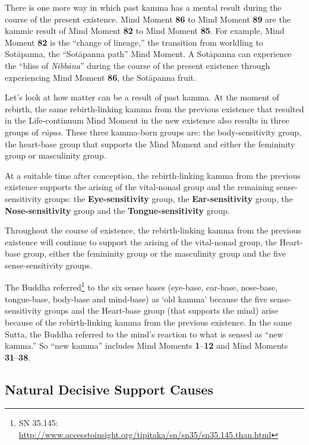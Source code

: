 There is one more way in which past kamma has a mental result during the course of the present existence. Mind Moment \textbf{86} to Mind Moment \textbf{89} are the kammic result of Mind Moment \textbf{82} to Mind Moment \textbf{85}. For example, Mind Moment \textbf{82} is the “change of lineage,” the transition from worldling to Sotāpanna, the “Sotāpanna path” Mind Moment. A Sotāpanna can experience the “bliss of \textit{Nibbāna}” during the course of the present existence through experiencing Mind Moment \textbf{86}, the Sotāpanna fruit.

Let's look at how matter can be a result of past kamma. At the moment of rebirth, the same rebirth-linking kamma from the previous existence that resulted in the Life-continuum Mind Moment in the new existence also results in three groups of \textit{rūpas}. These three kamma-born groups are: the body-sensitivity group, the heart-base group that supports the Mind Moment and either the femininity group or masculinity group.

\pagebreak

At a suitable time after conception, the rebirth-linking kamma from the previous existence supports the arising of the vital-nonad group and the remaining sense-sensitivity groups: the \textbf{Eye-sensitivity} group, the \textbf{Ear-sensitivity} group, the \textbf{Nose-sensitivity} group and the \textbf{Tongue-sensitivity} group.

Throughout the course of existence, the rebirth-linking kamma from the previous existence will continue to support the arising of the vital-nonad group, the Heart-base group, either the femininity group or the masculinity group and the five sense-sensitivity groups.

The Buddha referred\footnote{SN 35.145: \url{http://www.accesstoinsight.org/tipitaka/sn/sn35/sn35.145.than.html}} to the six sense bases (eye-base, ear-base, nose-base, tongue-base, body-base and mind-base) as ‘old kamma’ because the five sense-sensitivity groups and the Heart-base group (that supports the mind) arise because of the rebirth-linking kamma from the previous existence. In the same Sutta, the Buddha referred to the mind’s reaction to what is sensed as ``new kamma.'' So ``new kamma'' includes Mind Moments \textbf{1}--\textbf{12} and Mind Moments \textbf{31}--\textbf{38}.

\subsection*{Natural Decisive Support Causes}

